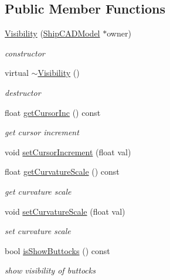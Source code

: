 \subsection*{Public Member Functions}
\begin{DoxyCompactItemize}
\item 
\hyperlink{classShipCAD_1_1Visibility_a7b3d38d4dd65392de8b2bac001afe6e8}{Visibility} (\hyperlink{classShipCAD_1_1ShipCADModel}{Ship\+C\+A\+D\+Model} $\ast$owner)
\begin{DoxyCompactList}\small\item\em constructor \end{DoxyCompactList}\item 
virtual \hyperlink{classShipCAD_1_1Visibility_a156b66ef71b8f44e15c95e14245dc7d2}{$\sim$\+Visibility} ()
\begin{DoxyCompactList}\small\item\em destructor \end{DoxyCompactList}\item 
float \hyperlink{classShipCAD_1_1Visibility_a1592aae0b63aca5b5bdc3032138cbffd}{get\+Cursor\+Inc} () const 
\begin{DoxyCompactList}\small\item\em get cursor increment \end{DoxyCompactList}\item 
void \hyperlink{classShipCAD_1_1Visibility_a0e2bff8e6bcaa36258c97e90263accd2}{set\+Cursor\+Increment} (float val)
\item 
float \hyperlink{classShipCAD_1_1Visibility_ae8cdc39bcc513f1bb66d0c39fdd1c46a}{get\+Curvature\+Scale} () const 
\begin{DoxyCompactList}\small\item\em get curvature scale \end{DoxyCompactList}\item 
void \hyperlink{classShipCAD_1_1Visibility_a5487027d259912f366351938a1a87085}{set\+Curvature\+Scale} (float val)
\begin{DoxyCompactList}\small\item\em set curvature scale \end{DoxyCompactList}\item 
bool \hyperlink{classShipCAD_1_1Visibility_a293f2a74bb76c65b7fa706e8aac353f1}{is\+Show\+Buttocks} () const 
\begin{DoxyCompactList}\small\item\em show visibility of buttocks \end{DoxyCompactList}\item 

\end{DoxyCompactItemize}

